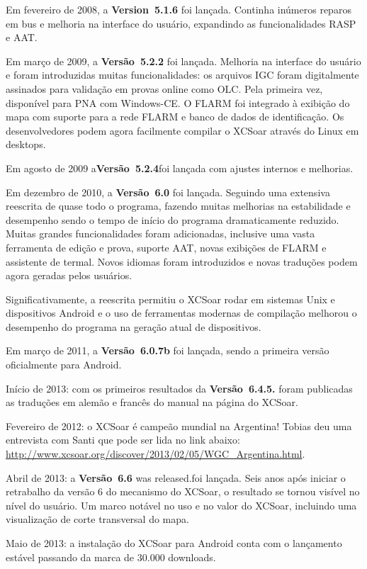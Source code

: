 Em fevereiro de 2008, a {\bf Version~5.1.6} foi lançada.  Continha inúmeros reparos em bus e melhoria na interface do usuário, expandindo as funcionalidades RASP e AAT. 

Em março de 2009, a {\bf Versão~5.2.2} foi lançada.  Melhoria na interface do usuário e foram introduzidas muitas funcionalidades: os arquivos IGC foram digitalmente assinados para validação em provas online como OLC.  Pela primeira vez, disponível para PNA com Windows-CE.  O FLARM foi integrado à exibição do mapa com suporte para a rede FLARM e banco de dados de identificação.  Os desenvolvedores podem agora facilmente compilar o XCSoar através do Linux em desktops. 

Em agosto de 2009 a{\bf Versão~5.2.4}foi lançada com ajustes internos e melhorias.

Em dezembro de 2010, a {\bf Versão~6.0} foi lançada.  Seguindo uma extensiva reescrita de quase todo o programa, fazendo muitas melhorias na estabilidade e desempenho sendo o tempo de início do programa dramaticamente reduzido.  Muitas grandes funcionalidades foram adicionadas, inclusive uma vasta ferramenta de edição e prova, suporte AAT, novas exibições de FLARM e assistente de termal.   Novos idiomas foram introduzidos e novas traduções podem agora geradas pelos usuários.

Significativamente, a reescrita permitiu o XCSoar rodar em sistemas Unix e dispositivos Android e o uso de ferramentas modernas de compilação melhorou o desempenho do programa na geração atual de dispositivos.

Em março de 2011, a {\bf Versão~6.0.7b} foi lançada, sendo a primeira versão oficialmente para Android.

Início de 2013: com os primeiros resultados da {\bf Versão~6.4.5.} foram publicadas as traduções em alemão e francês do manual na página do XCSoar.

Fevereiro de 2012: o XCSoar é campeão mundial na Argentina!  Tobias deu uma entrevista com Santi que pode ser lida no link abaixo:
\url{http://www.xcsoar.org/discover/2013/02/05/WGC_Argentina.html}.

Abril de 2013: a {\bf Versão~6.6} was released.foi lançada.  Seis anos após iniciar o retrabalho da versão 6 do mecanismo do XCSoar, o resultado se tornou visível no nível do usuário.  Um marco notável no uso e no valor do XCSoar, incluindo uma visualização de corte transversal do mapa.

Maio de 2013: a instalação do XCSoar para Android conta com o lançamento estável passando da marca de 30.000 downloads.


